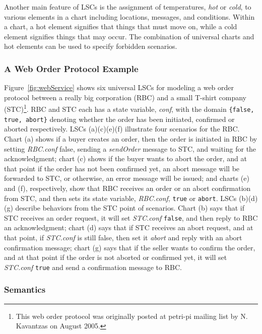 \documentclass[]{llncs}
\begin{document}
Another main feature of LSCs is the assignment of temperatures,
{\em hot} or {\em cold}, to various elements in a chart including
locations, messages, and conditions. Within a chart, a hot element
signifies that things that must move on, while a cold element
signifies things that may occur. The combination of universal charts
and hot elements can be used to specify forbidden scenarios.


\subsubsection{A Web Order Protocol Example}

Figure~\ref{fig:webService} shows six universal LSCs
for modeling a web order protocol between
a really big corporation (RBC) and a small T-shirt company
(STC)\footnote{This web order protocol was originally posted at
petri-pi mailing list by N. Kavantzas on August 2005.}.
RBC and STC each has a state variable, {\em conf}, with the domain
{\tt \{false, true, abort\}} denoting whether the order has been initiated,
confirmed or aborted respectively.
LSCs (a)(c)(e)(f) illustrate four scenarios for the RBC.
Chart (a) shows if a buyer creates an order, then
the order is initiated in RBC by setting {\em RBC.conf} false,
sending a {\em sendOrder} message to STC, and waiting
for the acknowledgment; chart (c)
shows if the buyer wants to abort the order, and
at that point if the order has not been confirmed yet,
an abort message will be forwarded to STC, or otherwise,
an error message will be issued; and charts (e) and (f), respectively,
show that RBC receives an order or an abort confirmation from STC,
and then sets its state variable, {\em RBC.conf}, {\tt true} or {\tt abort}.
LSCs (b)(d)(g) describe behaviors from the STC point of scenarios.
Chart (b) says that if STC receives an order request,
it will set {\em STC.conf} {\tt false},
and then reply to RBC an acknowledgment;
chart (d) says that if STC receives an abort request,
and at that point, if {\em STC.conf} is still false,
then set it {\em abort} and reply with an abort confirmation message;
chart (g) says that if the seller wants to confirm the order,
and at that point if the order is not aborted or confirmed yet,
it will set {\em STC.conf} {\tt true} and send
a confirmation message to RBC.


\subsubsection{Semantics}
\end{document}
